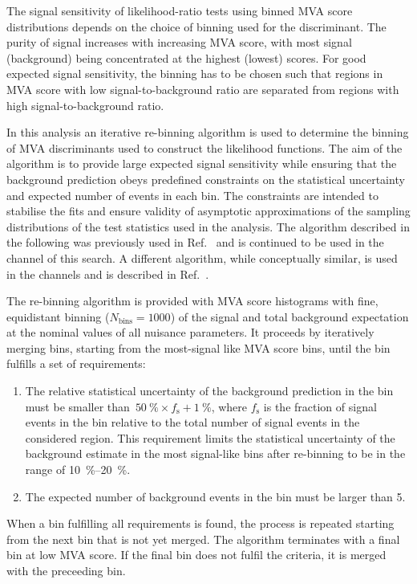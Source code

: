 The signal sensitivity of likelihood-ratio tests using binned MVA
score distributions depends on the choice of binning used for the
discriminant. The purity of signal increases with increasing MVA
score, with most signal (background) being concentrated at the highest
(lowest) scores. For good expected signal sensitivity, the binning has
to be chosen such that regions in MVA score with low
signal-to-background ratio are separated from regions with high
signal-to-background ratio.

In this analysis an iterative re-binning algorithm is used to
determine the binning of MVA discriminants used to construct the
likelihood functions. The aim of the algorithm is to provide large
expected signal sensitivity while ensuring that the background
prediction obeys predefined constraints on the statistical uncertainty
and expected number of events in each bin. The constraints are
intended to stabilise the fits and ensure validity of asymptotic
approximations of the sampling distributions of the test statistics
used in the analysis. The algorithm described in the
following was previously used in Ref.~\cite{HIGG-2016-16-witherratum}
and is continued to be used in the \hadhad channel of this search. A
different algorithm, while conceptually similar, is used in the
\lephad channels and is described in Ref.~\cite{ATLAS-CONF-2021-030}.

The re-binning algorithm is provided with MVA score histograms with
fine, equidistant binning ($N_\text{bins} = 1000$) of the signal and
total background expectation at the nominal values of all nuisance
parameters. It proceeds by iteratively merging bins, starting from the
most-signal like MVA score bins, until the bin fulfills a set of
requirements:
\begin{enumerate}

\item The relative statistical uncertainty of the background
  prediction in the bin must be smaller
  than~\mbox{$\SI{50}{\percent} \times f_\text{s} +
    \SI{1}{\percent}$}, where $f_\text{s}$ is the fraction of signal
  events in the bin relative to the total number of signal events in
  the considered region.  This requirement limits the statistical
  uncertainty of the background estimate in the most signal-like bins
  after re-binning to be in the range of \SIrange{10}{20}{\percent}.

\item The expected number of background events in the bin must be
  larger than 5.

\end{enumerate}
When a bin fulfilling all requirements is found, the process is
repeated starting from the next bin that is not yet merged. The
algorithm terminates with a final bin at low MVA score. If the final
bin does not fulfil the criteria, it is merged with the preceeding
bin.

